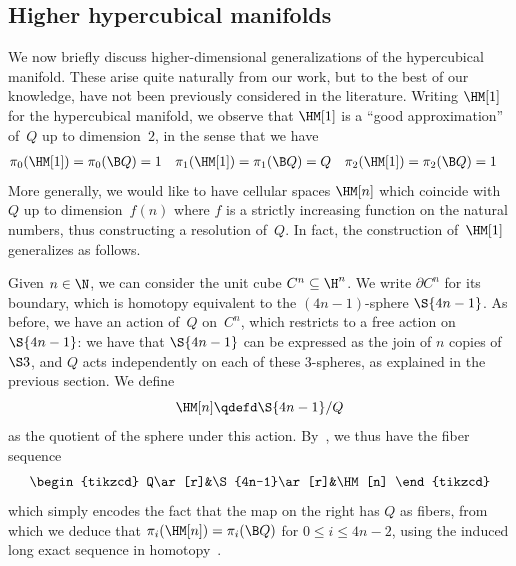 \documentclass[a4paper]{article}
\begin{document}
\subsection{Higher hypercubical manifolds}
\label{higher-topological-hypercubical}
We now briefly discuss higher-dimensional generalizations of the hypercubical manifold. These arise quite naturally from our work, but to the best of our knowledge, have not been previously considered in the literature. Writing $\HM[1]$ for the hypercubical manifold, we observe that $\HM[1]$ is a ``good approximation'' of~$Q$ up to dimension~$2$, in the sense that we have
\begin{align*}
  \pi_0(\HM[1])=\pi_0(\B Q)&=1
  &
  \pi_1(\HM[1])=\pi_1(\B Q)&=Q
  &
  \pi_2(\HM[1])=\pi_2(\B Q)&=1
\end{align*}
More generally, we would like to have cellular spaces $\HM[n]$ which coincide with~$Q$ up to dimension~$f(n)$ where $f$ is a strictly increasing function on the natural numbers, thus constructing a resolution of~$Q$. In fact, the construction of~$\HM[1]$ generalizes as follows.

Given $n\in\N$, we can consider the unit cube $C^n\subseteq\H^n$. We write $\partial C^n$ for its boundary, which is homotopy equivalent to the $(4n{-}1)$-sphere $\S{4n-1}$. As before, we have an action of~$Q$ on~$C^n$, which restricts to a free action on~$\S{4n-1}$: we have that $\S{4n-1}$ can be expressed as the join of $n$ copies of~$\S3$, and $Q$ acts independently on each of these 3-spheres, as explained in the previous section. We define
\[
  \HM[n]\qdefd\S{4n-1}/Q
\]
as the quotient of the sphere under this action.
%
By~\cite[Proposition 1.40]{hatcher}, we thus have the fiber sequence
\[
  \begin{tikzcd}
    Q\ar[r]&\S{4n-1}\ar[r]&\HM[n]
  \end{tikzcd}
\]
which simply encodes the fact that the map on the right has $Q$ as fibers, from which we deduce that $\pi_i(\HM[n])=\pi_i(\B Q)$ for $0\leq i\leq 4n-2$, using the induced long exact sequence in homotopy~\cite[Theorem 4.41]{hatcher}.
\end{document}
